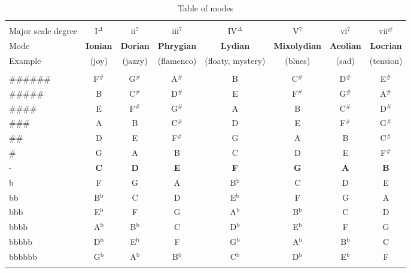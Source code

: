\documentclass{article}
\begin{document}
\begin{table}[!h]
	\caption{Table of modes }
	\begin{adjustwidth}{-2.3cm}{}
	\begin{tabular}{lccc cccc}
		\hline \vspace{-0.2cm} \\
		Major scale degree & I$^\Delta$ & ii$^{7}$ & iii$^{7}$ & IV$^\Delta$ & V$^7$ & vi$^{7}$ & vii$^{\varnothing}$ \\
		Mode & \textbf{Ionian} & \textbf{Dorian} & \textbf{Phrygian} & \textbf{Lydian} & \textbf{Mixolydian} & \textbf{Aeolian} & \textbf{Locrian}\\
		Example  & (joy) & (jazzy) & (flamenco) & (floaty, mystery) & (blues) & (sad) & (tension)\\		
		\hline \vspace{-0.2cm} \\ 
		{\scriptsize $\# \# \# \# \# \#$} & F$^\#$ & G$^\#$ & A$^\#$ & B & C$^\#$ & D$^\#$ & E$^\#$ \\
		{\scriptsize $\# \# \# \# \#$}    & B & C$^\#$ & D$^\#$ & E & F$^\#$ & G$^\#$ & A$^\#$\\
		{\scriptsize $\# \# \# \#$}       & E & F$^\#$ & G$^\#$ & A & B & C$^\#$ & D$^\#$\\
		{\scriptsize $\# \# \#$}          & A & B & C$^\#$ & D & E & F$^\#$ & G$^\#$\\
		{\scriptsize $\# \#$}             & D & E & F$^\#$ & G & A & B & C$^\#$\\
		{\scriptsize $\#$}                & G & A & B & C  & D & E & F$^\#$\\
		{\scriptsize -}                   & \textbf{C} & \textbf{D} & \textbf{E} & \textbf{F} & \textbf{G} & \textbf{A} & \textbf{B}\\
		{\scriptsize b}                   & F  & G  & A  & B$^\textrm{b}$ & C  & D  & E\\
		{\scriptsize bb}                  & B$^\textrm{b}$ & C     & D     & E$^\textrm{b}$ & F     & G     & A\\
		{\scriptsize bbb}                 & E$^\textrm{b}$ & F     & G     & A$^\textrm{b}$ & B$^\textrm{b}$ & C     & D\\
		{\scriptsize bbbb}                & A$^\textrm{b}$ & B$^\textrm{b}$ & C     & D$^\textrm{b}$ & E$^\textrm{b}$ & F     & G\\
		{\scriptsize bbbbb}               & D$^\textrm{b}$ & E$^\textrm{b}$ & F     & G$^\textrm{b}$ & A$^\textrm{b}$ & B$^\textrm{b}$ & C\\
		{\scriptsize bbbbbb}              & G$^\textrm{b}$ & A$^\textrm{b}$ & B$^\textrm{b}$ & C$^\textrm{b}$ & D$^\textrm{b}$ & E$^\textrm{b}$ & F\\
		\hline
		
		\hline \vspace{-0.2cm}
	\end{tabular}
	\label{tab: }
	\end{adjustwidth}
\end{table}
\end{document}

